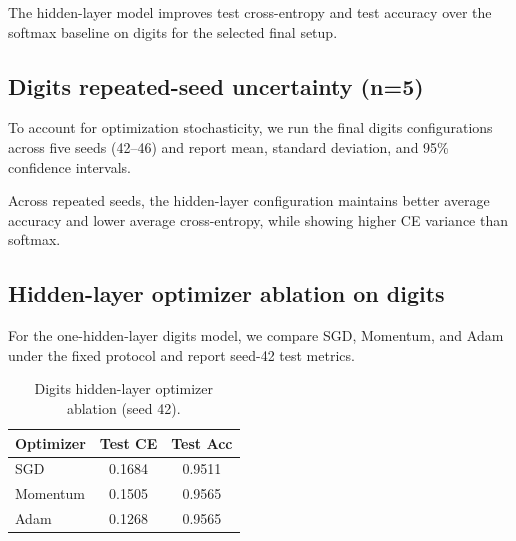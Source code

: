 \documentclass[sigconf,screen,nonacm]{acmart}
\begin{document}
The hidden-layer model improves test cross-entropy and test accuracy over the softmax baseline on digits for the selected final setup.

\subsection{Digits repeated-seed uncertainty (n=5)}
To account for optimization stochasticity, we run the final digits configurations across five seeds (42--46) and report mean, standard deviation, and 95\% confidence intervals.

\begin{table}[t]
    \centering
    \caption{Digits repeated-seed summary (n=5).}
    \label{tab:digits-ci}
\end{table}

Across repeated seeds, the hidden-layer configuration maintains better average accuracy and lower average cross-entropy, while showing higher CE variance than softmax.

\subsection{Hidden-layer optimizer ablation on digits}
For the one-hidden-layer digits model, we compare SGD, Momentum, and Adam under the fixed protocol and report seed-42 test metrics.

\begin{table}[t]
    \centering
    \caption{Digits hidden-layer optimizer ablation (seed 42).}
    \label{tab:digits-opt-ablation}
    \begin{tabular}{lcc}
        \toprule
        Optimizer & Test CE & Test Acc \\
        \midrule
        SGD & 0.1684 & 0.9511 \\
        Momentum & 0.1505 & 0.9565 \\
        Adam & 0.1268 & 0.9565 \\
        \bottomrule
    \end{tabular}
\end{table}
\end{document}
